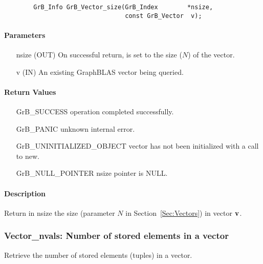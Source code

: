 \begin{verbatim}
        GrB_Info GrB_Vector_size(GrB_Index        *nsize,
                                 const GrB_Vector  v);
\end{verbatim}

\paragraph{Parameters}

\begin{itemize}[leftmargin=1.1in]
    \item[{\sf nsize}] ({\sf OUT}) On successful return, is set to the size ($N$) 
                                   of the vector.
    \item[{\sf v}]     ({\sf IN})  An existing GraphBLAS vector being queried.
\end{itemize}

\paragraph{Return Values}

\begin{itemize}[leftmargin=2.1in]
\item[{\sf GrB\_SUCCESS}]   operation completed successfully.
\item[{\sf GrB\_PANIC}]     unknown internal error.
\item[{\sf GrB\_UNINITIALIZED\_OBJECT}]  vector has not been initialized with a call to {\sf new}.
\item[{\sf GrB\_NULL\_POINTER}]    {\sf nsize} pointer is {\sf NULL}.
\end{itemize}

\paragraph{Description}

Return in {\sf nsize} the size (parameter $N$ in Section~\ref{Sec:Vectors}) in vector ${\bf v}$.

\subsubsection{{\sf Vector\_nvals}: Number of stored elements in a vector}
\label{Sec:Vector_nvals}

Retrieve the number of stored elements (tuples) in a vector.

